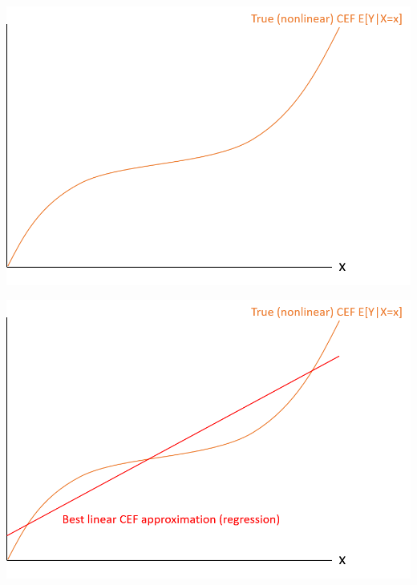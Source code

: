 \documentclass[11pt,handout,aspectratio=169]{beamer}
\begin{document}
\begin{frame}
		
	\begin{center}
		\hspace{0.7cm}\includegraphics[scale=0.7]{ols1.png}
	\end{center}
	
\end{frame}

\begin{frame}
	
	\begin{center}
		\hspace{0.7cm}\includegraphics[scale=0.7]{ols2.png}
	\end{center}
	
\end{frame}
\end{document}
